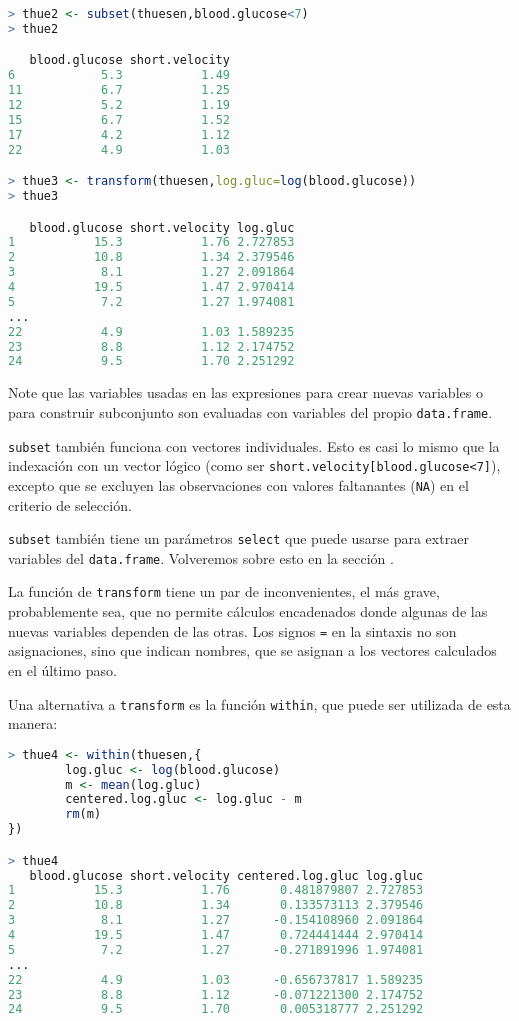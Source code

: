 \begin{lstlisting}[language=R]
> thue2 <- subset(thuesen,blood.glucose<7)
> thue2

   blood.glucose short.velocity
6            5.3           1.49
11           6.7           1.25
12           5.2           1.19
15           6.7           1.52
17           4.2           1.12
22           4.9           1.03

> thue3 <- transform(thuesen,log.gluc=log(blood.glucose))
> thue3

   blood.glucose short.velocity log.gluc
1           15.3           1.76 2.727853
2           10.8           1.34 2.379546
3            8.1           1.27 2.091864
4           19.5           1.47 2.970414
5            7.2           1.27 1.974081
...
22           4.9           1.03 1.589235
23           8.8           1.12 2.174752
24           9.5           1.70 2.251292
\end{lstlisting}

Note que las variables usadas en las expresiones para crear nuevas variables o
para construir subconjunto son evaluadas con variables del propio
\texttt{data.frame}.

\texttt{subset} también funciona con vectores individuales. Esto es casi lo
mismo que la indexación con un vector lógico (como ser
\texttt{short.velocity[blood.glucose<7]}), excepto que se excluyen las
observaciones con valores faltanantes (\texttt{NA}) en el criterio de
selección.

\texttt{subset} también tiene un parámetros \texttt{select} que puede usarse
para extraer variables del \texttt{data.frame}. Volveremos sobre esto en la
sección \label{appending frames}.

La función de \texttt{transform} tiene un par de inconvenientes, el más grave,
probablemente sea, que no permite cálculos encadenados donde algunas de las
nuevas variables dependen de las otras. Los signos \texttt{=} en la sintaxis no
son asignaciones, sino que indican nombres, que se asignan a los vectores
calculados en el último paso.

Una alternativa a \texttt{transform} es la función \texttt{within}, que puede
ser utilizada de esta manera:

\begin{lstlisting}[language=R]
> thue4 <- within(thuesen,{
        log.gluc <- log(blood.glucose)
        m <- mean(log.gluc)
        centered.log.gluc <- log.gluc - m
        rm(m)
})

> thue4
   blood.glucose short.velocity centered.log.gluc log.gluc
1           15.3           1.76       0.481879807 2.727853
2           10.8           1.34       0.133573113 2.379546
3            8.1           1.27      -0.154108960 2.091864
4           19.5           1.47       0.724441444 2.970414
5            7.2           1.27      -0.271891996 1.974081
...
22           4.9           1.03      -0.656737817 1.589235
23           8.8           1.12      -0.071221300 2.174752
24           9.5           1.70       0.005318777 2.251292
\end{lstlisting}

